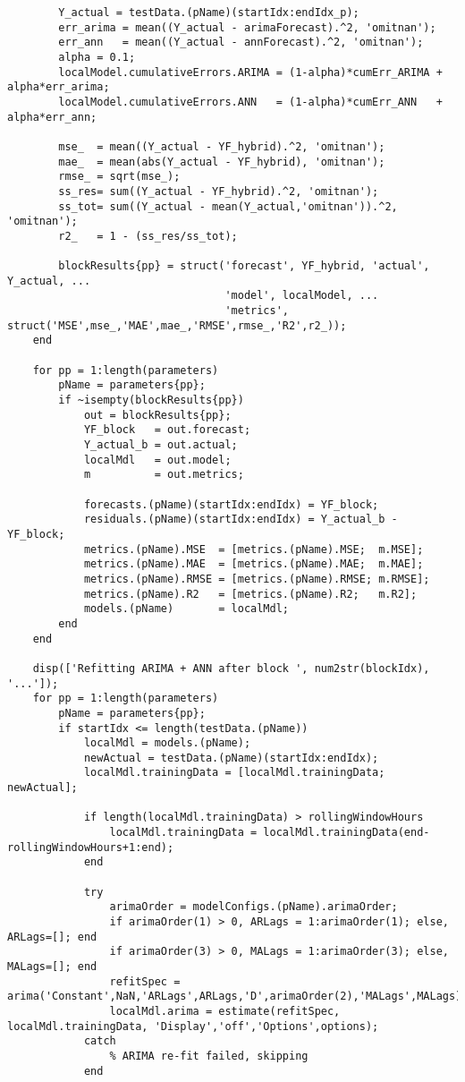 \begin{verbatim}
        Y_actual = testData.(pName)(startIdx:endIdx_p);
        err_arima = mean((Y_actual - arimaForecast).^2, 'omitnan');
        err_ann   = mean((Y_actual - annForecast).^2, 'omitnan');
        alpha = 0.1;
        localModel.cumulativeErrors.ARIMA = (1-alpha)*cumErr_ARIMA + alpha*err_arima;
        localModel.cumulativeErrors.ANN   = (1-alpha)*cumErr_ANN   + alpha*err_ann;

        mse_  = mean((Y_actual - YF_hybrid).^2, 'omitnan');
        mae_  = mean(abs(Y_actual - YF_hybrid), 'omitnan');
        rmse_ = sqrt(mse_);
        ss_res= sum((Y_actual - YF_hybrid).^2, 'omitnan');
        ss_tot= sum((Y_actual - mean(Y_actual,'omitnan')).^2, 'omitnan');
        r2_   = 1 - (ss_res/ss_tot);

        blockResults{pp} = struct('forecast', YF_hybrid, 'actual', Y_actual, ...
                                  'model', localModel, ...
                                  'metrics', struct('MSE',mse_,'MAE',mae_,'RMSE',rmse_,'R2',r2_));
    end

    for pp = 1:length(parameters)
        pName = parameters{pp};
        if ~isempty(blockResults{pp})
            out = blockResults{pp};
            YF_block   = out.forecast;
            Y_actual_b = out.actual;
            localMdl   = out.model;
            m          = out.metrics;

            forecasts.(pName)(startIdx:endIdx) = YF_block;
            residuals.(pName)(startIdx:endIdx) = Y_actual_b - YF_block;
            metrics.(pName).MSE  = [metrics.(pName).MSE;  m.MSE];
            metrics.(pName).MAE  = [metrics.(pName).MAE;  m.MAE];
            metrics.(pName).RMSE = [metrics.(pName).RMSE; m.RMSE];
            metrics.(pName).R2   = [metrics.(pName).R2;   m.R2];
            models.(pName)       = localMdl;
        end
    end

    disp(['Refitting ARIMA + ANN after block ', num2str(blockIdx), '...']);
    for pp = 1:length(parameters)
        pName = parameters{pp};
        if startIdx <= length(testData.(pName))
            localMdl = models.(pName);
            newActual = testData.(pName)(startIdx:endIdx);
            localMdl.trainingData = [localMdl.trainingData; newActual];

            if length(localMdl.trainingData) > rollingWindowHours
                localMdl.trainingData = localMdl.trainingData(end-rollingWindowHours+1:end);
            end

            try
                arimaOrder = modelConfigs.(pName).arimaOrder;
                if arimaOrder(1) > 0, ARLags = 1:arimaOrder(1); else, ARLags=[]; end
                if arimaOrder(3) > 0, MALags = 1:arimaOrder(3); else, MALags=[]; end
                refitSpec = arima('Constant',NaN,'ARLags',ARLags,'D',arimaOrder(2),'MALags',MALags);
                localMdl.arima = estimate(refitSpec, localMdl.trainingData, 'Display','off','Options',options);
            catch
                % ARIMA re-fit failed, skipping
            end


\end{verbatim}
